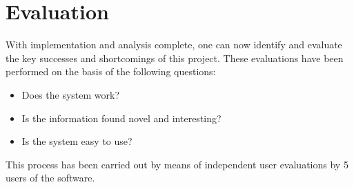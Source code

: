 \chapter{Evaluation}
\label{cha:eval}
With implementation and analysis complete, one can now identify and evaluate the key successes and shortcomings of this project. These evaluations have been performed on the basis of the following questions:

\begin{itemize}
\item Does the system work?
\item Is the information found novel and interesting?
\item Is the system easy to use?
\end{itemize}

This process has been carried out by means of independent user evaluations by 5 users of the software.